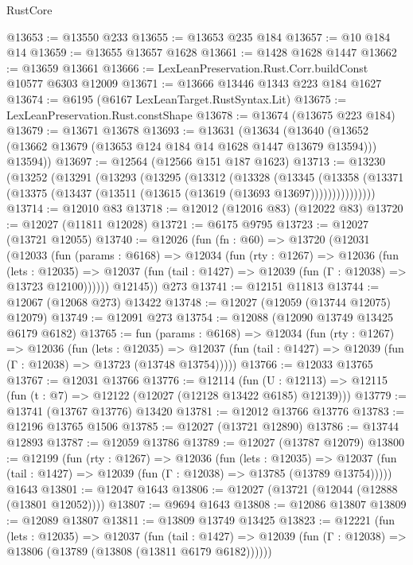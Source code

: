 \begin{lexlean}{RustCore}
\begin{coremodule}
@13653 := @13550 @233
@13655 := @13653 @235 @184
@13657 := @10 @184 @14
@13659 := @13655 @13657 @1628
@13661 := @1428 @1628 @1447
@13662 := @13659 @13661
@13666 := LexLeanPreservation.Rust.Corr.buildConst @10577 @6303 @12009
@13671 := @13666 @13446 @1343 @223 @184 @1627
@13674 := @6195 (@6167 LexLeanTarget.RustSyntax.Lit)
@13675 := LexLeanPreservation.Rust.constShape
@13678 := @13674 (@13675 @223 @184)
@13679 := @13671 @13678
@13693 := @13631
    (@13634
      (@13640 (@13652 (@13662 @13679 (@13653 @124 @184 @14 @1628 @1447 @13679 @13594))) @13594))
@13697 := @12564 (@12566 @151 @187 @1623)
@13713 := @13230
    (@13252
      (@13291
        (@13293
          (@13295
            (@13312
              (@13328
                (@13345
                  (@13358
                    (@13371 (@13375 (@13437 (@13511 (@13615 (@13619 (@13693 @13697)))))))))))))))
@13714 := @12010 @83
@13718 := @12012 (@12016 @83) (@12022 @83)
@13720 := @12027 (@11811 @12028)
@13721 := @6175 @9795
@13723 := @12027 (@13721 @12055)
@13740 := @12026
    (fun (fn : @60) =>
    @13720
      (@12031
        (@12033
          (fun (params : @6168) =>
          @12034
            (fun (rty : @1267) =>
            @12036
              (fun (lets : @12035) =>
              @12037 (fun (tail : @1427) => @12039 (fun (Γ : @12038) => @13723 @12100))))))
        @12145))
    @273
@13741 := @12151 @11813
@13744 := @12067 (@12068 @273) @13422
@13748 := @12027 (@12059 (@13744 @12075) @12079)
@13749 := @12091 @273
@13754 := @12088 (@12090 @13749 @13425 @6179 @6182)
@13765 := fun (params : @6168) =>
  @12034
    (fun (rty : @1267) =>
    @12036
      (fun (lets : @12035) =>
      @12037 (fun (tail : @1427) => @12039 (fun (Γ : @12038) => @13723 (@13748 @13754)))))
@13766 := @12033 @13765
@13767 := @12031 @13766
@13776 := @12114
    (fun (U : @12113) => @12115 (fun (t : @7) => @12122 (@12027 (@12128 @13422 @6185) @12139)))
@13779 := @13741 (@13767 @13776) @13420
@13781 := @12012 @13766 @13776
@13783 := @12196 @13765 @1506
@13785 := @12027 (@13721 @12890)
@13786 := @13744 @12893
@13787 := @12059 @13786
@13789 := @12027 (@13787 @12079)
@13800 := @12199
    (fun (rty : @1267) =>
    @12036
      (fun (lets : @12035) =>
      @12037 (fun (tail : @1427) => @12039 (fun (Γ : @12038) => @13785 (@13789 @13754)))))
    @1643
@13801 := @12047 @1643
@13806 := @12027 (@13721 (@12044 (@12888 (@13801 @12052))))
@13807 := @9694 @1643
@13808 := @12086 @13807
@13809 := @12089 @13807
@13811 := @13809 @13749 @13425
@13823 := @12221
    (fun (lets : @12035) =>
    @12037
      (fun (tail : @1427) =>
      @12039 (fun (Γ : @12038) => @13806 (@13789 (@13808 (@13811 @6179 @6182))))))

\end{coremodule}
\end{lexlean}
